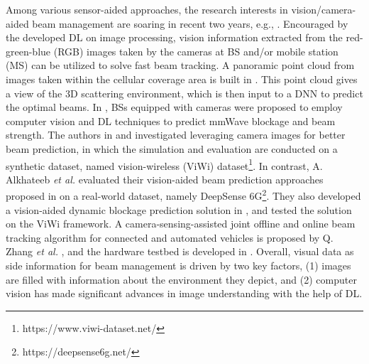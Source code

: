 \documentclass[journal,comsoc]{IEEEtran}
\begin{document}
Among various sensor-aided approaches, the research interests in vision/camera-aided beam management are soaring in recent two years, e.g., \cite{3D-Scene-Beam-Selection-2020,Millimeter-Wave-Cameras-2020,Vision-Aided-Beam-Tracking-DL-2021,Image-Index-2021,Vision-Position-Multi-Modal-Beam-Prediction-2022,Computer-Vision-Beam-Tracking-Real-World-2022,Towards-Real-World-6G-Drone-Communication-2022,Vision-Aided-6G-Blockage-2021,Camera-Sensing-Beam-Tracking-2022,Testbed-Performance-Evaluation-2022,Machine-Learning-Based-Vision-Aided-Beam-Selection-2022}. Encouraged by the developed DL on image processing, vision information extracted from the red-green-blue (RGB) images taken by the cameras at BS and/or mobile station (MS) can be utilized to solve fast beam tracking. A panoramic point cloud from images taken within the cellular coverage area is built in \cite{3D-Scene-Beam-Selection-2020}. This point cloud gives a view of the 3D scattering environment, which is then input to a DNN to predict the optimal beams. In \cite{Millimeter-Wave-Cameras-2020}, BSs equipped with cameras were proposed to employ computer vision and DL techniques to predict mmWave blockage and beam strength. The authors in \cite{Vision-Aided-Beam-Tracking-DL-2021} and \cite{Image-Index-2021} investigated leveraging camera images for better beam prediction, in which the simulation and evaluation are conducted on a synthetic dataset, named vision-wireless (ViWi) dataset\footnote{https://www.viwi-dataset.net/}. In contrast, A. Alkhateeb \emph{et al.} evaluated their vision-aided beam prediction approaches proposed in \cite{Vision-Position-Multi-Modal-Beam-Prediction-2022,Computer-Vision-Beam-Tracking-Real-World-2022,Towards-Real-World-6G-Drone-Communication-2022} on a real-world dataset, namely DeepSense 6G\footnote{https://deepsense6g.net/}. They also developed a vision-aided dynamic blockage prediction solution in \cite{Vision-Aided-6G-Blockage-2021}, and tested the solution on the ViWi framework. A camera-sensing-assisted joint offline and online beam tracking algorithm for connected and automated vehicles is proposed by Q. Zhang \emph{et al.} \cite{Camera-Sensing-Beam-Tracking-2022}, and the hardware testbed is developed in \cite{Testbed-Performance-Evaluation-2022}. Overall, visual data as side information for beam management is driven by two key factors, (1) images are filled with information about the environment they depict, and (2) computer vision has made significant advances in image understanding with the help of DL.
\end{document}
